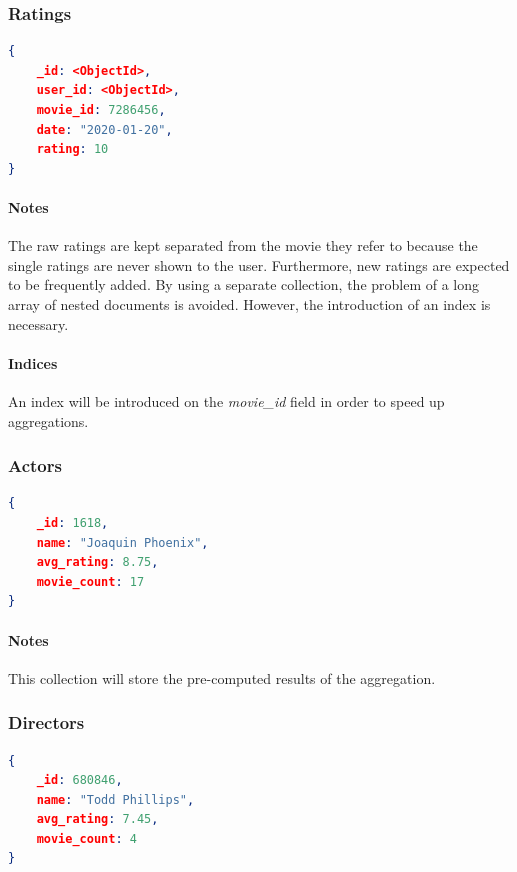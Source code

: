\documentclass[11pt]{article}
\begin{document}
\subsubsection{Ratings}
\label{sec:ratings}

\begin{lstlisting}[language=json]	
{
	_id: <ObjectId>,
	user_id: <ObjectId>,
	movie_id: 7286456,
	date: "2020-01-20",
	rating: 10
}
\end{lstlisting}

\paragraph{Notes}
The raw ratings are kept separated from the movie they refer to because the single 
ratings are never shown to the user. 
Furthermore, new ratings are expected to be frequently added.
By using a separate collection, the problem of a long array of nested documents 
is avoided. However, the introduction of an index is necessary.


\paragraph{Indices} 
An index will be introduced on the \emph{movie\_id} field in order to speed up
aggregations.

\subsubsection{Actors}
\label{sec:actors}

\begin{lstlisting}[language=json]	
{
	_id: 1618,
	name: "Joaquin Phoenix",
	avg_rating: 8.75,
	movie_count: 17
}
\end{lstlisting}

\paragraph{Notes}
This collection will store the pre-computed results of the aggregation.

\subsubsection{Directors}
\label{sec:directors}

\begin{lstlisting}[language=json]	
{
	_id: 680846,
	name: "Todd Phillips",
	avg_rating: 7.45,
	movie_count: 4	
}
\end{lstlisting}
\end{document}
